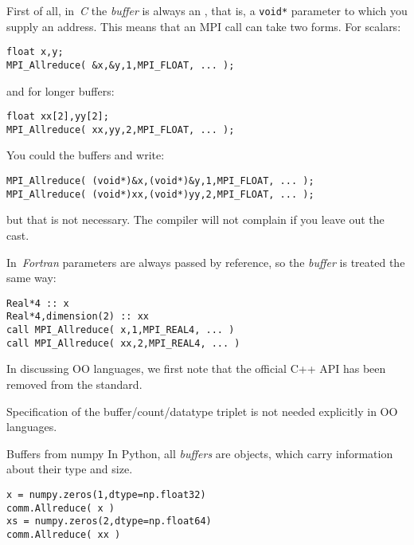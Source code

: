 First of all, in~\emph{C} the
\emph{buffer}
is always an , that is,
a \lstinline+void*+ parameter to which you supply an address.
This means that an MPI call can take two forms.
For scalars:
\begin{lstlisting}
float x,y;
MPI_Allreduce( &x,&y,1,MPI_FLOAT, ... );
\end{lstlisting}
and for longer buffers:
\begin{lstlisting}
float xx[2],yy[2];
MPI_Allreduce( xx,yy,2,MPI_FLOAT, ... );
\end{lstlisting}
You could  the buffers and write:
\begin{lstlisting}
MPI_Allreduce( (void*)&x,(void*)&y,1,MPI_FLOAT, ... );
MPI_Allreduce( (void*)xx,(void*)yy,2,MPI_FLOAT, ... );
\end{lstlisting}
but that is not necessary. The compiler will not complain
if you leave out the cast.

In~\emph{Fortran} parameters are always passed by reference,
so the \emph{buffer}
is treated the same way:
\lstset{language=Fortran}
\begin{lstlisting}
Real*4 :: x
Real*4,dimension(2) :: xx
call MPI_Allreduce( x,1,MPI_REAL4, ... )
call MPI_Allreduce( xx,2,MPI_REAL4, ... )
\end{lstlisting}

In discussing \ac{OO} languages, we first note that
the official C++ \ac{API} has been removed from the standard.

Specification of the buffer/count/datatype triplet is not
needed explicitly in \ac{OO} languages.

\begin{pythonnote}{Buffers from numpy}
  In Python, all \emph{buffers}
  are  objects, which carry information about their type and size.
\lstset{language=Python}
\begin{lstlisting}
x = numpy.zeros(1,dtype=np.float32)
comm.Allreduce( x )
xs = numpy.zeros(2,dtype=np.float64)
comm.Allreduce( xx )
\end{lstlisting}
\end{pythonnote}

